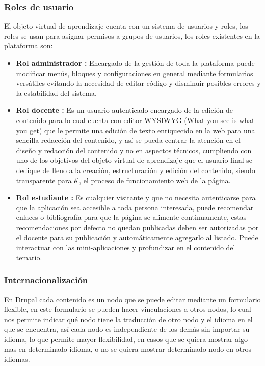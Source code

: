 \documentclass[letterpaper, 11pt, oneside]{article}
\theoremstyle{definition}
\theoremstyle{remark}
\begin{document}
\subsubsection{Roles de usuario}

El objeto virtual de aprendizaje cuenta con un sistema de usuarios y roles, los roles se usan para asignar permisos a grupos de usuarios, los roles existentes en la plataforma son:

\begin{itemize}
  \item {\bf Rol administrador :} Encargado de la gestión de toda la plataforma puede modificar menús, bloques y configuraciones en general mediante formularios versátiles evitando la necesidad de editar código y disminuir posibles errores y la estabilidad del sistema.
    
  \item {\bf Rol docente :} Es un usuario autenticado encargado de la edición de contenido para lo cual cuenta con editor WYSIWYG (What you see is what you get) que le permite una edición de texto enriquecido en la web para una sencilla redacción del contenido, y así se pueda centrar la atención en el diseño y redacción del contenido y no en aspectos técnicos, cumpliendo con uno de los objetivos del objeto virtual de aprendizaje que el usuario final se dedique de lleno a la creación, estructuración y edición del contenido, siendo transparente para él, el proceso de funcionamiento web de la página.

 \item {\bf Rol estudiante :} Es cualquier visitante y que no necesita autenticarse para que la aplicación sea accesible a toda persona interesada, puede recomendar enlaces o bibliografía para que la página se alimente continuamente, estas recomendaciones por defecto no quedan publicadas deben ser autorizadas por el docente para su publicación y automáticamente agregarlo al listado. Puede interactuar con las mini-aplicaciones y profundizar en el contenido del temario.
\end{itemize}

\newpage

\subsubsection{Internacionalización}

En Drupal cada contenido es un nodo que se puede editar mediante un formulario flexible, en este formulario se pueden hacer vinculaciones a otros nodos, lo cual nos permite indicar qué nodo tiene la traducción de otro nodo y el idioma en el que se encuentra, así cada nodo es independiente de los demás sin importar su idioma, lo que permite mayor flexibilidad, en casos que se quiera mostrar algo mas en determinado idioma, o no se quiera mostrar determinado nodo en otros idiomas.
\end{document}
